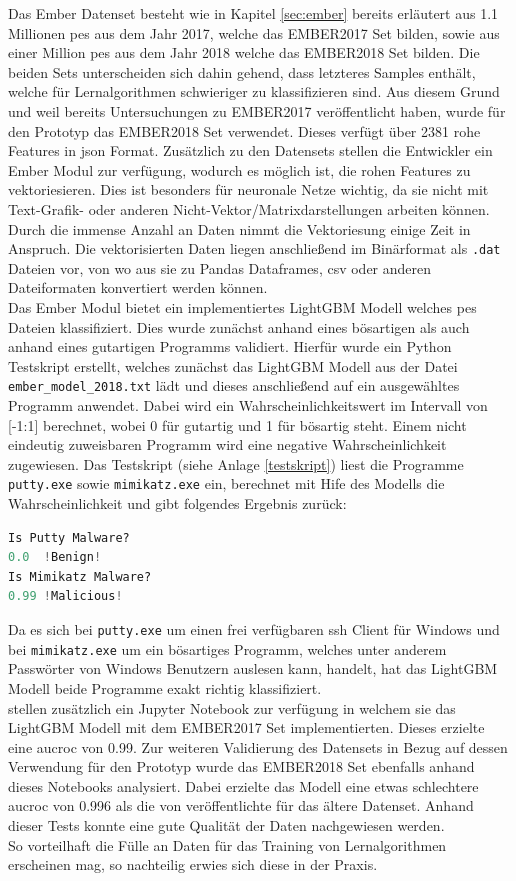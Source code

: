 \documentclass[
    12pt, %
    DIV10,
    ngerman, %
    a4paper, %
    oneside, %
    titlepage, %
    parskip=half, %
    headings=normal, %
    listof=totoc, %
    bibliography=totoc, %
    index=totoc, %
    captions=tableheading, %
    final %
]{scrreprt}
\begin{document}
Das Ember Datenset besteht wie in Kapitel \ref{sec:ember} bereits erläutert aus 1.1 Millionen \ac{pes} aus dem Jahr 2017, welche das EMBER2017 Set bilden, sowie aus einer Million \ac{pes} aus dem Jahr 2018 welche das EMBER2018 Set bilden. Die beiden Sets unterscheiden sich dahin gehend, dass letzteres Samples enthält, welche für Lernalgorithmen schwieriger zu klassifizieren sind. Aus diesem Grund und weil \textcite{anderson2018ember} bereits Untersuchungen zu EMBER2017 veröffentlicht haben, wurde für den Prototyp das EMBER2018 Set verwendet. Dieses verfügt über 2381 rohe Features in \ac{json} Format. Zusätzlich zu den Datensets stellen die Entwickler ein Ember Modul zur verfügung, wodurch es möglich ist, die rohen Features zu vektoriesieren. Dies ist besonders für neuronale Netze wichtig, da sie nicht mit Text-Grafik- oder anderen Nicht-Vektor/Matrixdarstellungen arbeiten können. Durch die immense Anzahl an Daten nimmt die Vektoriesung einige Zeit in Anspruch. Die vektorisierten Daten liegen anschließend im Binärformat als \texttt{.dat} Dateien vor, von wo aus sie zu Pandas Dataframes, \ac{csv} oder anderen Dateiformaten konvertiert werden können.\\
Das Ember Modul bietet ein implementiertes LightGBM Modell welches \ac{pes} Dateien klassifiziert. Dies wurde zunächst anhand eines bösartigen als auch anhand eines gutartigen Programms validiert.
Hierfür wurde ein Python Testskript erstellt, welches zunächst das LightGBM Modell aus der Datei \texttt{ember\_model\_2018.txt} lädt und dieses anschließend auf ein ausgewähltes Programm anwendet. Dabei wird ein Wahrscheinlichkeitswert im Intervall von [-1:1] berechnet, wobei 0 für gutartig und 1 für bösartig steht. Einem nicht eindeutig zuweisbaren Programm wird eine negative Wahrscheinlichkeit zugewiesen. Das Testskript (siehe Anlage \ref{testskript}) liest die Programme \texttt{putty.exe} sowie \texttt{mimikatz.exe} ein, berechnet mit Hife des Modells die Wahrscheinlichkeit und gibt folgendes Ergebnis zurück:
\begin{lstlisting}[language=Python]
Is Putty Malware?
0.0  !Benign!
Is Mimikatz Malware?
0.99 !Malicious!
\end{lstlisting}
Da es sich bei \texttt{putty.exe} um einen frei verfügbaren \ac{ssh} Client für Windows und bei \texttt{mimikatz.exe} um ein bösartiges Programm, welches unter anderem Passwörter von Windows Benutzern auslesen kann, handelt, hat das LightGBM Modell beide Programme exakt richtig klassifiziert.\\
\textcite{anderson2018ember} stellen zusätzlich ein Jupyter Notebook zur verfügung in welchem sie das  LightGBM Modell mit dem EMBER2017 Set implementierten. Dieses erzielte eine \ac{aucroc} von 0.99. Zur weiteren Validierung des Datensets in Bezug auf dessen Verwendung für den Prototyp wurde das EMBER2018 Set ebenfalls anhand dieses Notebooks analysiert. Dabei erzielte das Modell eine etwas schlechtere \ac{aucroc} von 0.996 als die von \textcite{anderson2018ember} veröffentlichte für das ältere Datenset. Anhand dieser Tests konnte eine gute Qualität der Daten nachgewiesen werden.\\ So vorteilhaft die Fülle an Daten für das Training von Lernalgorithmen erscheinen mag, so nachteilig erwies sich diese in der Praxis.
\end{document}
